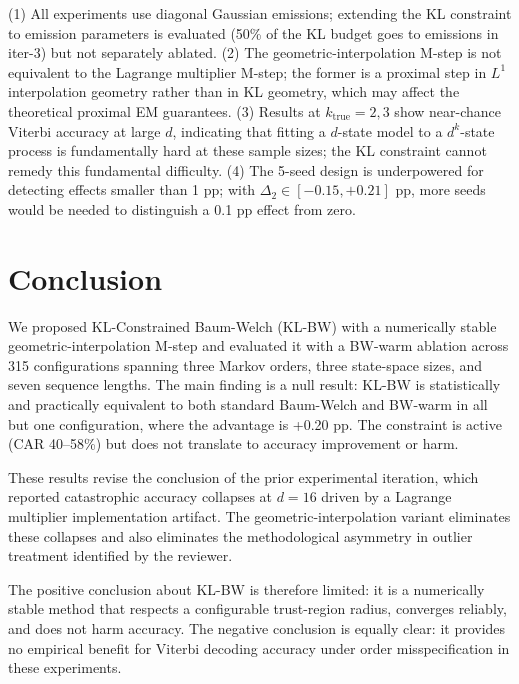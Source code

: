 \documentclass[11pt,letterpaper]{article}
\begin{document}
(1) All experiments use diagonal Gaussian emissions; extending the KL constraint to emission parameters is evaluated
(50\% of the KL budget goes to emissions in iter-3) but not separately ablated. (2) The geometric-interpolation M-step is
not equivalent to the Lagrange multiplier M-step; the former is a proximal step in $L^1$ interpolation geometry rather
than in KL geometry, which may affect the theoretical proximal EM guarantees. (3) Results at $k_\text{true}=2,3$ show
near-chance Viterbi accuracy at large $d$, indicating that fitting a $d$-state model to a $d^k$-state process is
fundamentally hard at these sample sizes; the KL constraint cannot remedy this fundamental difficulty. (4) The 5-seed
design is underpowered for detecting effects smaller than 1 pp; with $\Delta_2 \in [-0.15, +0.21]$ pp, more seeds would
be needed to distinguish a 0.1 pp effect from zero.

\section{Conclusion}

We proposed KL-Constrained Baum-Welch (KL-BW) with a numerically stable geometric-interpolation M-step and evaluated it
with a BW-warm ablation across 315 configurations spanning three Markov orders, three state-space sizes, and seven sequence
lengths. The main finding is a null result: KL-BW is statistically and practically equivalent to both standard Baum-Welch
and BW-warm in all but one configuration, where the advantage is +0.20 pp. The constraint is active (CAR 40--58\%) but
does not translate to accuracy improvement or harm.

These results revise the conclusion of the prior experimental iteration, which reported catastrophic accuracy collapses at
$d=16$ driven by a Lagrange multiplier implementation artifact. The geometric-interpolation variant eliminates these
collapses and also eliminates the methodological asymmetry in outlier treatment identified by the reviewer.

The positive conclusion about KL-BW is therefore limited: it is a numerically stable method that respects a configurable
trust-region radius, converges reliably, and does not harm accuracy. The negative conclusion is equally clear: it provides
no empirical benefit for Viterbi decoding accuracy under order misspecification in these experiments.
\end{document}
